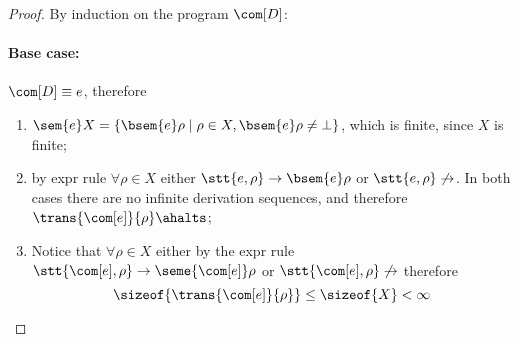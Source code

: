 \begin{proof}
  By induction on the program \(\com[D]\):
  \paragraph*{Base case:\\}
  \(\com[D] \equiv e\), therefore
  \begin{enumerate}[label=(\roman*).]
  \item \label{it:1}
    \(\sem{e}X = \{\bsem{e}\rho \mid \rho \in X , \bsem{e}\rho \neq
    \bot\}\), which is finite, since \(X\) is finite;
  \item \label{it:2} by expr rule \(\forall \rho \in X\) either
    \(\stt{e,\rho} \to \bsem{e}\rho\) or \(\stt{e,\rho} \not\to\). In
    both cases there are no infinite derivation sequences, and therefore
    \(\trans{\com[e]}{\rho} \ahalts\);
  \item Notice that \(\forall \rho \in X\) either by the expr rule
    \(\stt{\com[e], \rho} \to \seme{\com[e]}\rho\) or
    \(\stt{\com[e], \rho}\not\to\) therefore
    \[\sizeof{\trans{\com[e]}{\rho}} \leq \sizeof{X} < \infty\]
  \end{enumerate}
  

\end{proof}
